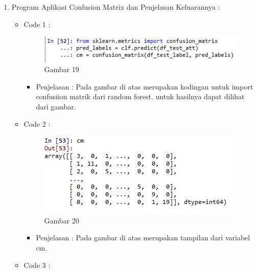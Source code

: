 \begin{enumerate}
\par
\par
\item Program Aplikasi Confusion Matrix dan Penjelasan Keluarannya :
\begin{itemize}
\item Code 1 :
\par
\begin{figure}[ht]
\centering
\includegraphics[scale=0.7]{figures/pd19.jpg}
\caption{Gambar 19}
\label{contoh}
\end{figure}
\par
\begin{itemize}
\item Penjelasan :  Pada gambar di atas merupakan kodingan untuk import confusiion matrik dari random forest. untuk hasilnya dapat dilihat dari gambar.
\par 
\par
\end{itemize}
\item Code  2 :
\par
\begin{figure}[ht]
\centering
\includegraphics[scale=0.7]{figures/pd20.jpg}
\caption{Gambar 20}
\label{contoh}
\end{figure}
\par
\begin{itemize}
\item Penjelasan : Pada gambar di atas merupakan tampilan dari variabel cm.
\par
\par
\end{itemize}
\item Code  3 :
\par
\begin{figure}[ht]
\centering

\end{figure}
\end{itemize}
\end{enumerate}
